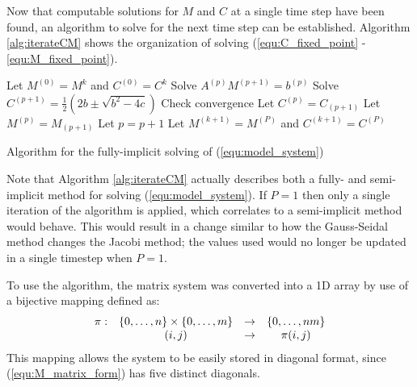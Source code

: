 Now that computable solutions for $M$ and $C$ at a single time step have been found, an algorithm to solve for the next time step can be established.
Algorithm \ref{alg:iterateCM} shows the organization of solving (\ref{equ:C_fixed_point} - \ref{equ:M_fixed_point}). 
\begin{algorithm}
  \Begin
  {
    Let $M^{(0)} = M^{k}$ and $C^{(0)} = C^{k}$\;
    {
        Solve $A^{(p)} M^{(p+1)} = b^{(p)}$\;
        Solve $C^{(p+1)} = \frac{1}{2} \left( 2b \pm \sqrt{b^2 - 4c} \right)$\;
        Check convergence\; 
        Let $C^{(p)} = C_{(p+1)}$\;
        Let $M^{(p)} = M_{(p+1)}$\;
        Let $p = p + 1 $\;
    }
    Let $M^{(k+1)} = M^{(P)}$ and $C^{(k+1)} = C^{(P)}$\;
  }
  \caption{Algorithm for the fully-implicit solving of (\ref{equ:model_system}) }
  \label{alg:iterateCM}
\end{algorithm}

Note that Algorithm \ref{alg:iterateCM} actually describes both a fully- and semi- implicit method for solving (\ref{equ:model_system}). 
If $P = 1$ then only a single iteration of the algorithm is applied, which correlates to a semi-implicit method would behave.
This would result in a change similar to how the Gauss-Seidal method changes the Jacobi method; the values used would no longer be updated in a single timestep when $P = 1$.

To use the algorithm, the matrix system was converted into a 1D array by use of a bijective mapping defined as:
\begin{equation}
\begin{array}{c c c c}
  \pi :& \{ 0, \ldots, n\} \times \{0, \ldots, m\} & \to & \{0, \ldots, nm \} \\
       & (i,j)                                     & \to & \pi(i,j)
\end{array}
\end{equation}
This mapping allows the system to be easily stored in diagonal format, since (\ref{equ:M_matrix_form}) has five distinct diagonals.


